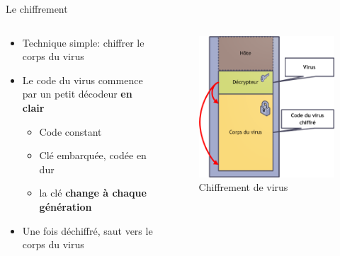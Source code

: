 \documentclass{beamer}
\begin{document}
\begin{frame}{Le chiffrement}
\begin{columns}[t]
\begin{column}{5cm}
\begin{exampleblock}{}
\begin{itemize}
\item Technique simple: chiffrer le corps du virus
\item Le code du virus commence par un petit décodeur \textbf{en clair}
\begin{itemize}
\item Code constant
\item Clé embarquée, codée en dur
\item la clé \textbf{change à chaque génération}
\end{itemize}
\item Une fois déchiffré, saut vers le corps du virus
\end{itemize}
\end{exampleblock}
\end{column}
\begin{column}{5cm}
\begin{figure}[!ht]
\includegraphics[scale=0.3]{chiffrement.png}
\center
\caption{Chiffrement de virus}
\end{figure}
\end{column}
\end{columns}
\end{frame}
\end{document}

